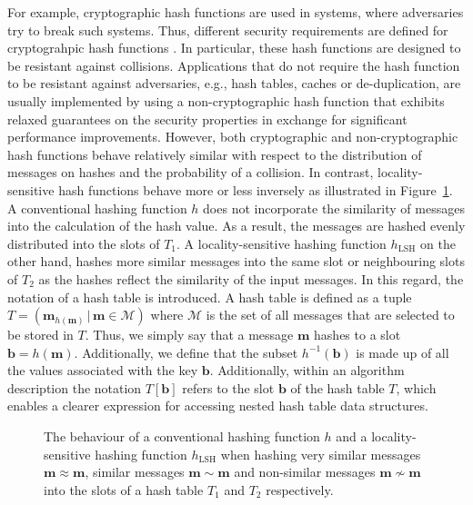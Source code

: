 \documentclass[../../../main.tex]{subfiles}
\begin{document}
For example, cryptographic hash functions are used in systems, where adversaries try to break such systems. Thus, different security requirements are defined for cryptograhpic hash functions \cite[349]{williamcryptography}. In particular, these hash functions are designed to be resistant against collisions. Applications that do not require the hash function to be resistant against adversaries, e.g., hash tables, caches or de-duplication, are usually implemented by using a non-cryptographic hash function that exhibits relaxed guarantees on the security properties in exchange for significant performance improvements. However, both cryptographic and non-cryptographic hash functions behave relatively similar with respect to the distribution of messages on hashes and the probability of a collision. In contrast, locality-sensitive hash functions behave more or less inversely as illustrated in Figure~\ref{fig:hashing_differences}. A conventional hashing function $h$ does not incorporate the similarity of messages into the calculation of the hash value. As a result, the messages are hashed evenly distributed into the slots of $T_1$. A locality-sensitive hashing function $h_{\text{LSH}}$ on the other hand, hashes more similar messages into the same slot or neighbouring slots of $T_2$ as the hashes reflect the similarity of the input messages. In this regard, the notation of a hash table is introduced. A hash table is defined as a tuple $T=(\bm{m}_{h(\bm{m})} \, | \, \bm{m} \in \mathcal{M})$ where $\mathcal{M}$ is the set of all messages that are selected to be stored in $T$. Thus, we simply say that a message $\bm{m}$ hashes to a slot $\bm{b} = h(\bm{m})$. Additionally, we define that the subset $h^{-1}(\bm{b})$ is made up of all the values associated with the key $\bm{b}$. Additionally, within an algorithm description the notation $T[\bm{b}]$ refers to the slot $\bm{b}$ of the hash table $T$, which enables a clearer expression for accessing nested hash table data structures.

\begin{figure}[t!]
    \centering
    
    \caption{The behaviour of a conventional hashing function $h$ and a locality-sensitive hashing function $h_{\text{LSH}}$ when hashing very similar messages $\bm{m} \approx \bm{m}$, similar messages $\bm{m} \sim \bm{m}$ and non-similar messages $\bm{m} \not\sim \bm{m}$ into the slots of a hash table $T_1$ and $T_2$ respectively.}
    \label{fig:hashing_differences}
\end{figure}
\end{document}
